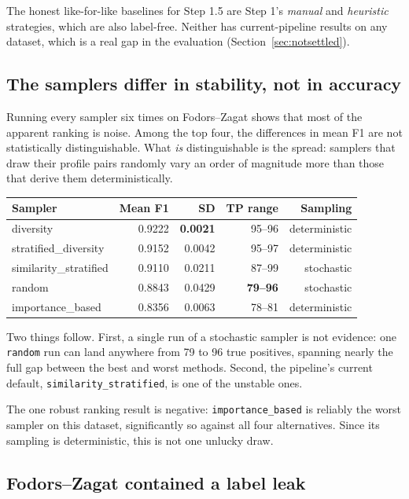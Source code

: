\documentclass[11pt]{article}
\begin{document}
The honest like-for-like baselines for Step 1.5 are Step 1's \emph{manual} and
\emph{heuristic} strategies, which are also label-free. Neither has current-pipeline
results on any dataset, which is a real gap in the evaluation
(Section~\ref{sec:notsettled}).

\subsection{The samplers differ in stability, not in accuracy}

Running every sampler six times on Fodors--Zagat shows that most of the apparent
ranking is noise. Among the top four, the differences in mean F1 are not
statistically distinguishable. What \emph{is} distinguishable is the spread: samplers
that draw their profile pairs randomly vary an order of magnitude more than those
that derive them deterministically.

\begin{center}
\small
\begin{tabular}{lrrrr}
\toprule
Sampler & Mean F1 & SD & TP range & Sampling \\
\midrule
diversity & 0.9222 & \textbf{0.0021} & 95--96 & deterministic \\
stratified\_diversity & 0.9152 & 0.0042 & 95--97 & deterministic \\
similarity\_stratified & 0.9110 & 0.0211 & 87--99 & stochastic \\
random & 0.8843 & 0.0429 & \textbf{79--96} & stochastic \\
importance\_based & 0.8356 & 0.0063 & 78--81 & deterministic \\
\bottomrule
\end{tabular}
\end{center}

Two things follow. First, a single run of a stochastic sampler is not evidence: one
\texttt{random} run can land anywhere from 79 to 96 true positives, spanning nearly
the full gap between the best and worst methods. Second, the pipeline's current
default, \texttt{similarity\_stratified}, is one of the unstable ones.

The one robust ranking result is negative: \texttt{importance\_based} is reliably the
worst sampler on this dataset, significantly so against all four alternatives. Since
its sampling is deterministic, this is not one unlucky draw.

\subsection{Fodors--Zagat contained a label leak}
\label{sec:leak}
\end{document}
